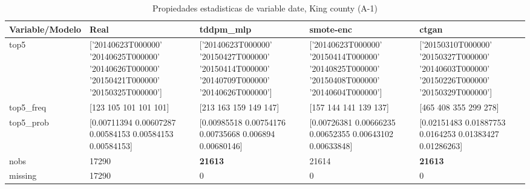\begin{table}[H]
\centering
\fontsize{8}{14}\selectfont
\caption{Propiedades  estadisticas de variable date, King county (A-1)}
\label{table-stats-king county-a-1-date}
\begin{tabular}{|l|m{10em}|m{10em}|m{10em}|m{10em}|}
\hline
 \rowcolor[gray]{0.8}
Variable/Modelo & Real & tddpm\_mlp & smote-enc & ctgan \\
\hline top5 & ['20140623T000000' '20140625T000000' '20140626T000000' '20150421T000000'
 '20150325T000000'] & ['20140623T000000' '20150427T000000' '20150414T000000' '20140709T000000'
 '20140626T000000'] & ['20140623T000000' '20150414T000000' '20140825T000000' '20150408T000000'
 '20140604T000000'] & ['20150310T000000' '20150327T000000' '20140603T000000' '20150226T000000'
 '20150329T000000'] \\
\hline top5\_freq & [123 105 101 101 101] & [213 163 159 149 147] & [157 144 141 139 137] & [465 408 355 299 278] \\
\hline top5\_prob & [0.00711394 0.00607287 0.00584153 0.00584153 0.00584153] & [0.00985518 0.00754176 0.00735668 0.006894   0.00680146] & [0.00726381 0.00666235 0.00652355 0.00643102 0.00633848] & [0.02151483 0.01887753 0.0164253  0.01383427 0.01286263] \\
\hline nobs & 17290 & \bfseries 21613 & \cellcolor[rgb]{0.9, 0.54, 0.52} 21614 & \bfseries 21613 \\
\hline missing & 17290 & 0 & 0 & 0 \\
\hline
\end{tabular}
\end{table}
